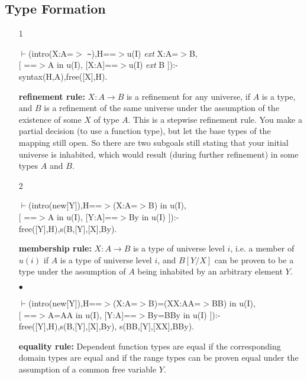 \documentclass[11pt]{report}
\begin{document}
 \subsection{Type Formation}
 \begin{enumerate}
 \item[1]
\begin{sf}\begin{tabbing}
$\vdash$(intro(X:A=$>$ {\verb`~`}),H==$>$u(I) \mbox{\it ext} X:A=$>$B, \\[-0.15ex]
\hspace{2em}[ ==$>$A in u(I), [X:A]==$>$u(I) \mbox{\it ext} B ]):-\\[-0.15ex]
\hspace{2em}syntax(H,A),free([X],H).
\end{tabbing}\end{sf}

 {\bf refinement rule:} 
 $X:A\rightarrow B$ is a refinement for any universe, 
 if $A$ is a type, and $B$ is a refinement of the same universe 
 under the assumption of the existence of some $X$ of type $A$. 
 This is a stepwise refinement rule. 
 You make a partial decision (to use a function type),
 but let the base types of the mapping still open. So there are two 
 subgoals still stating that your initial universe is inhabited,
 which would result (during further refinement) in some types $A$ and
 $B$.
  
 \item[2]
\begin{sf}\begin{tabbing}
$\vdash$(intro(new[Y]),H==$>$(X:A=$>$B) in u(I), \\[-0.15ex]
\hspace{2em}[ ==$>$A in u(I), [Y:A]==$>$By in u(I) ]):-\\[-0.15ex]
\hspace{2em}free([Y],H),s(B,[Y],[X],By).
\end{tabbing}\end{sf}

 {\bf membership rule:} 
 $X:A\rightarrow B$ is a type of universe level $i$,
 i.e. a member of $u(i)$ if $A$ is a type of universe level $i$,
 and $B[Y/X]$ can be proven to be a type under the assumption of $A$
 being inhabited by an arbitrary element $Y$.
  
 \item[$\bullet$]
\begin{sf}\begin{tabbing}
$\vdash$(intro(new[Y]),H==$>$(X:A=$>$B)=(XX:AA=$>$BB) in u(I),\\[-0.15ex]
\hspace{2em}[ ==$>$A=AA in u(I), [Y:A]==$>$By=BBy in u(I) ]):-\\[-0.15ex]
\hspace{2em}free([Y],H),s(B,[Y],[X],By), s(BB,[Y],[XX],BBy).
\end{tabbing}\end{sf}

 {\bf equality rule:}
 Dependent function types are equal if the corresponding domain
 types are equal and if the range types can be proven equal
 under the assumption of a common free variable $Y$. 
 \end{enumerate}
  
\end{document}
